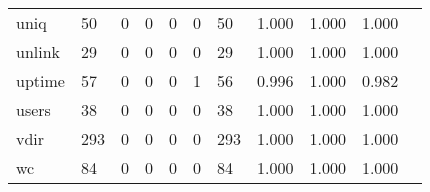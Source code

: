 \begin{longtable}{lp{1.20cm}p{1.20cm}p{1.20cm}p{1.20cm}p{1.20cm}p{1.20cm}p{1.20cm}p{1.20cm}p{1.20cm}p{1.20cm}}
uniq      &                                    50 &                                                  0 &                                                  0 &                                                  0 &                                                  0 &                                                 50 &                                         1.000 &                                              1.000 &                                              1.000 \\
unlink    &                                    29 &                                                  0 &                                                  0 &                                                  0 &                                                  0 &                                                 29 &                                         1.000 &                                              1.000 &                                              1.000 \\
uptime    &                                    57 &                                                  0 &                                                  0 &                                                  0 &                                                  1 &                                                 56 &                                         0.996 &                                              1.000 &                                              0.982 \\
users     &                                    38 &                                                  0 &                                                  0 &                                                  0 &                                                  0 &                                                 38 &                                         1.000 &                                              1.000 &                                              1.000 \\
vdir      &                                   293 &                                                  0 &                                                  0 &                                                  0 &                                                  0 &                                                293 &                                         1.000 &                                              1.000 &                                              1.000 \\
wc        &                                    84 &                                                  0 &                                                  0 &                                                  0 &                                                  0 &                                                 84 &                                         1.000 &                                              1.000 &                                              1.000 \\

\end{longtable}

